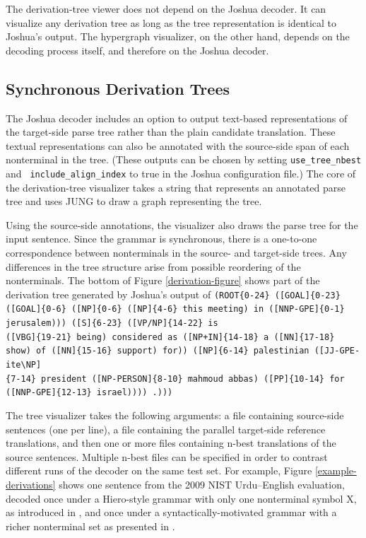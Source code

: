 \documentclass[logo]{pbml}
\begin{document}
The derivation-tree viewer does not depend on the Joshua decoder. It can
visualize any derivation tree as long as the tree representation is identical
to Joshua's output. The hypergraph visualizer, on the other hand, depends
on the decoding process itself, and therefore on the Joshua decoder.

\subsection{Synchronous Derivation Trees}


The Joshua decoder includes an option to output text-based representations
of the target-side parse tree rather than the plain candidate translation.
These textual representations can also be annotated with the source-side
span of each nonterminal in the tree. 
(These outputs can be chosen by setting {\tt use\_tree\_nbest} and {\tt 
include\_align\_index} to true in the Joshua configuration
file.)
The core of the derivation-tree visualizer
 takes a string that represents an annotated parse tree and uses JUNG to draw
a graph representing the tree.

Using the source-side annotations, the visualizer also draws the 
parse tree for the input sentence. Since the grammar is synchronous, there is
a one-to-one correspondence between nonterminals in the source- and target-side
trees. Any differences in the tree structure arise from possible reordering
of the nonterminals.
The bottom of Figure \ref{derivation-figure} shows part of the derivation tree 
generated by Joshua's output of 
{\tt (ROOT\{0-24\} ([GOAL]\{0-23\} ([GOAL]\{0-6\} ([NP]\{0-6\} ([NP]\{4-6\} this meeting) in ([NNP-GPE]\{0-1\} jerusalem))) ([S]\{6-23\} ([VP/NP]\{14-22\} is 
 \\
 ([VBG]\{19-21\} being) considered as ([NP+IN]\{14-18\} a ([NN]\{17-18\} show) of ([NN]\{15-16\} support) for)) ([NP]\{6-14\} palestinian ([JJ-GPE-ite\textbackslash NP]
 \\
\{7-14\} president ([NP-PERSON]\{8-10\} mahmoud abbas) ([PP]\{10-14\} for 
 \\
 ([NNP-GPE]\{12-13\} israel)))) .)))}


The tree visualizer takes the following arguments:  a file containing source-side sentences (one per line), a file containing the parallel target-side reference translations, and then one or more files containing n-best translations of the source sentences.
Multiple n-best files can be specified in order to contrast different runs
of the decoder on the same test set. For example, Figure \ref{example-derivations} shows one
sentence from the 2009 NIST Urdu--English evaluation, decoded once under a 
Hiero-style grammar with only one nonterminal symbol X, as introduced in
\cite{Chiang2005}, and once under a
syntactically-motivated grammar with a richer nonterminal set as  presented in \cite{samt2006}.
\end{document}
